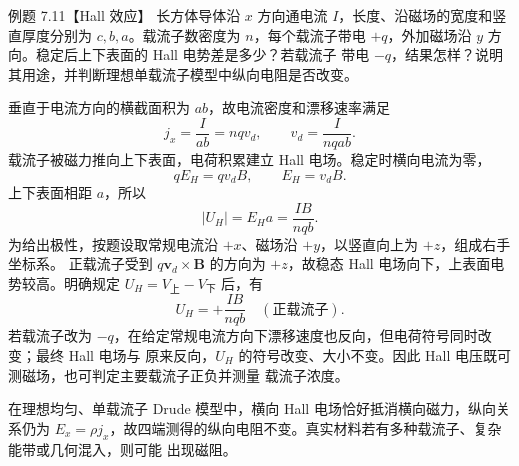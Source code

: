 \Needspace{0.47\textheight}
\begin{origexamplebox}{例题 7.11【Hall 效应】}
长方体导体沿 $x$ 方向通电流 $I$，长度、沿磁场的宽度和竖直厚度分别为 $c,b,a$。载流子数密度为
$n$，每个载流子带电 $+q$，外加磁场沿 $y$ 方向。稳定后上下表面的 Hall 电势差是多少？若载流子
带电 $-q$，结果怎样？说明其用途，并判断理想单载流子模型中纵向电阻是否改变。

\begin{center}
\end{center}
\label{fig:em22-question-11}
\end{origexamplebox}

\begin{xesolution}
垂直于电流方向的横截面积为 $ab$，故电流密度和漂移速率满足
\begin{equation}
  j_x=\frac{I}{ab}=nqv_d,
  \qquad v_d=\frac{I}{nqab}.
\end{equation}
载流子被磁力推向上下表面，电荷积累建立 Hall 电场。稳定时横向电流为零，
\[
  qE_H=qv_dB,
  \qquad E_H=v_dB.
\]
上下表面相距 $a$，所以
\begin{equation}
  \boxed{|U_H|=E_Ha=\frac{IB}{nqb}}.
\end{equation}
为给出极性，按题设取常规电流沿 $+x$、磁场沿 $+y$，以竖直向上为 $+z$，组成右手坐标系。
正载流子受到 $q\boldsymbol v_d\times\boldsymbol B$ 的方向为 $+z$，故稳态 Hall 电场向下，上表面电势较高。明确规定
$U_H=V_{\text{上}}-V_{\text{下}}$ 后，有
\[
 \boxed{U_H=+\frac{IB}{nqb}\quad(\text{正载流子})}.
\]
若载流子改为 $-q$，在给定常规电流方向下漂移速度也反向，但电荷符号同时改变；最终 Hall 电场与
原来反向，$U_H$ 的符号改变、大小不变。因此 Hall 电压既可测磁场，也可判定主要载流子正负并测量
载流子浓度。

在理想均匀、单载流子 Drude 模型中，横向 Hall 电场恰好抵消横向磁力，纵向关系仍为
$E_x=\rho j_x$，故四端测得的纵向电阻不变。真实材料若有多种载流子、复杂能带或几何混入，则可能
出现磁阻。

\hallDiagram
\end{xesolution}

